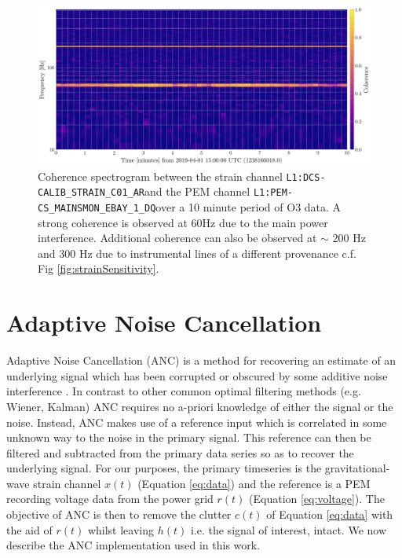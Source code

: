 \documentclass[pra,superscriptaddress,reprint,amsmath,amssymb,nofootinbib]{revtex4-2}
\newcommand{\StrainChanName}{\texttt{L1:DCS-CALIB\_STRAIN\_C01\_AR}}
\newcommand{\PEMChanName}{\texttt{L1:PEM-CS\_MAINSMON\_EBAY\_1\_DQ}}
\begin{document}
\begin{figure}
	\begin{center}
		\includegraphics[width=\textwidth]{images/coherence_spectrogram}
	\end{center}
	\caption{\label{correlation_1}
		Coherence spectrogram between the strain channel \StrainChanName  and the PEM channel \PEMChanName  	over a 10 minute period of O3 data. A strong coherence is observed at 60Hz due to the main power interference. Additional coherence can also be observed at $\sim$ 200 Hz and 300 Hz due to instrumental lines of a different provenance c.f. Fig \ref{fig:strainSensitivity}.}
\end{figure}



\section{Adaptive Noise Cancellation}\label{sec:method}


Adaptive Noise Cancellation (ANC) is a method for recovering an estimate of an underlying signal which has been corrupted or obscured by some additive noise interference \cite{Widrow1451965}. In contrast to other common optimal filtering methods (e.g. Wiener, Kalman) ANC requires no a-priori knowledge of either the signal or the noise. Instead, ANC makes use of a reference input which is correlated in some unknown way to the noise in the primary signal. This reference  can then be filtered and subtracted from the primary data series so as to recover the underlying signal. For our purposes, the primary timeseries is the gravitational-wave strain channel $x(t)$ (Equation \eqref{eq:data}) and the reference is a PEM recording voltage data from the power grid $r(t)$ (Equation \eqref{eq:voltage}). The objective of ANC is then to remove the clutter $c(t)$ of Equation \eqref{eq:data} with the aid of $r(t)$ whilst leaving $h(t)$ i.e. the signal of interest, intact. We now describe the ANC implementation used in this work. \newline 
\end{document}
